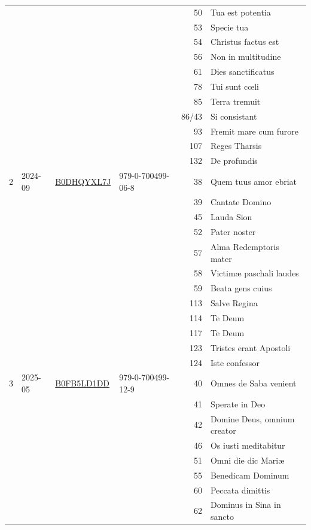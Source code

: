 \documentclass{ees}
\begin{document}
{\begin{xltabular}{\linewidth}{rlllrX}
    & & & & 50    & Tua est potentia \\
    & & & & 53    & Specie tua \\
    & & & & 54    & Christus factus est \\
    & & & & 56    & Non in multitudine \\
    & & & & 61    & Dies sanctificatus \\
    & & & & 78    & Tui sunt cœli \\
    & & & & 85    & Terra tremuit \\
    & & & & 86/43 & Si consistant \\
    & & & & 93    & Fremit mare cum furore \\
    & & & & 107   & Reges Tharsis \\
    & & & & 132   & De profundis \\
  2 & 2024-09 & \href{https://www.amazon.de/dp/B0DHQYXL7J}{B0DHQYXL7J} & 979-0-700499-06-8
          & 38    & Quem tuus amor ebriat \\
    & & & & 39    & Cantate Domino \\
    & & & & 45    & Lauda Sion \\
    & & & & 52    & Pater noster \\
    & & & & 57    & Alma Redemptoris mater \\
    & & & & 58    & Victimæ paschali laudes \\
    & & & & 59    & Beata gens cuius \\
    & & & & 113   & Salve Regina \\
    & & & & 114   & Te Deum \\
    & & & & 117   & Te Deum \\
    & & & & 123   & Tristes erant Apostoli \\
    & & & & 124   & Iste confessor \\
  3 & 2025-05 & \href{https://www.amazon.de/dp/B0FB5LD1DD}{B0FB5LD1DD} & 979-0-700499-12-9
          & 40    & Omnes de Saba venient \\
    & & & & 41    & Sperate in Deo \\
    & & & & 42    & Domine Deus, omnium creator \\
    & & & & 46    & Os iusti meditabitur \\
    & & & & 51    & Omni die dic Mariæ \\
    & & & & 55    & Benedicam Dominum \\
    & & & & 60    & Peccata dimittis \\
    & & & & 62    & Dominus in Sina in sancto \\

\end{xltabular}}
\end{document}
